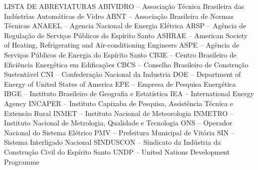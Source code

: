 \begin{}
    LISTA DE ABREVIATURAS
    ABIVIDRO – Associação Técnica Brasileira das Indústrias Automáticas de Vidro
    ABNT – Associação Brasileira de Normas Técnicas
    ANAEEL – Agencia Nacional de Energia Elétrica
    ARSP – Agência de Regulação de Serviços Públicos do Espírito Santo
    ASHRAE – American Society of Heating, Refrigerating and Air-conditioning Engineers
    ASPE – Agência de Serviços Públicos de Energia do Espírito Santo
    CB3E – Centro Brasileiro de Eficiência Energética em Edificações 
    CBCS – Conselho Brasileiro de Construção Sustentável 
    CNI – Confederação Nacional da Industria 
    DOE – Department of Energy of United States of America 
    EPE – Empresa de Pesquisa Energética 
    IBGE – Instituto Brasileiro de Geografia e Estatística 
    IEA – International Energy Agency 
    INCAPER – Instituto Capixaba de Pesquisa, Assistência Técnica e Extensão Rural 
    INMET – Instituto Nacional de Meteorologia 
    INMETRO – Instituto Nacional de Metrologia, Qualidade e Tecnologia 
    ONS – Operador Nacional do Sistema Elétrico 
    PMV – Prefeitura Municipal de Vitória 
    SIN – Sistema Interligado Nacional 
    SINDUSCON – Sindicato da Indústria da Construção Civil do Espírito Santo 
    UNDP – United Nations Development Programme 

\end{}